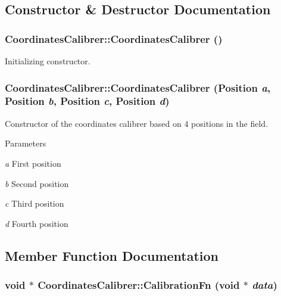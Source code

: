 \subsection{Constructor \& Destructor Documentation}
\hypertarget{classCoordinatesCalibrer_ac9a522299ada8f2e58ed8f0c91f4f396}{
\subsubsection[{CoordinatesCalibrer}]{\setlength{\rightskip}{0pt plus 5cm}CoordinatesCalibrer::CoordinatesCalibrer ()}}
\label{classCoordinatesCalibrer_ac9a522299ada8f2e58ed8f0c91f4f396}


Initializing constructor. 

\hypertarget{classCoordinatesCalibrer_a3b6304945fa64ac97a1b0bbc78753155}{
\subsubsection[{CoordinatesCalibrer}]{\setlength{\rightskip}{0pt plus 5cm}CoordinatesCalibrer::CoordinatesCalibrer (Position {\em a}, \/  Position {\em b}, \/  Position {\em c}, \/  Position {\em d})}}
\label{classCoordinatesCalibrer_a3b6304945fa64ac97a1b0bbc78753155}


Constructor of the coordinates calibrer based on 4 positions in the field. 


\begin{DoxyParams}{Parameters}
\item[{\em a}]First position \item[{\em b}]Second position \item[{\em c}]Third position \item[{\em d}]Fourth position \end{DoxyParams}


\subsection{Member Function Documentation}
\hypertarget{classCoordinatesCalibrer_a4ce4c153ae8c3e50faccfba40e6bc4ea}{
\subsubsection[{CalibrationFn}]{\setlength{\rightskip}{0pt plus 5cm}void $\ast$ CoordinatesCalibrer::CalibrationFn (void $\ast$ {\em data})}}
\label{classCoordinatesCalibrer_a4ce4c153ae8c3e50faccfba40e6bc4ea}


